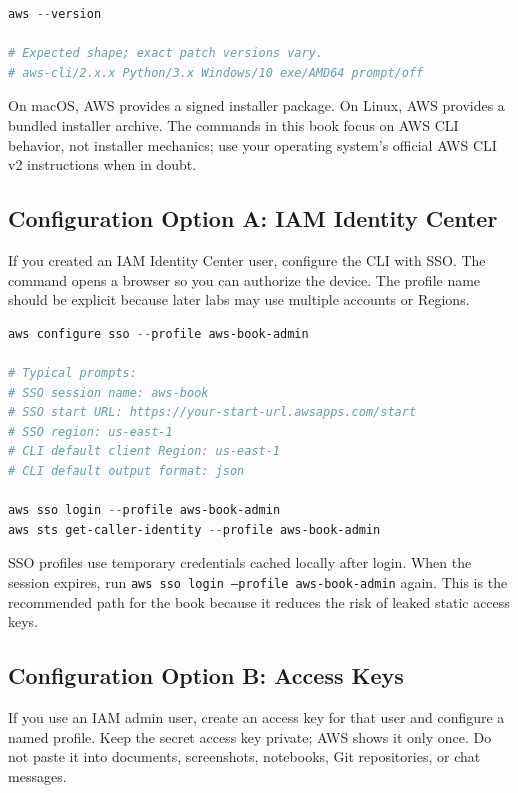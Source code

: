 \begin{lstlisting}[language=PowerShell,caption={Verifying AWS CLI v2 from Windows PowerShell.},label={lst:aws-cli-version}]
aws --version

# Expected shape; exact patch versions vary.
# aws-cli/2.x.x Python/3.x Windows/10 exe/AMD64 prompt/off
\end{lstlisting}

On macOS, AWS provides a signed installer package. On Linux, AWS provides a bundled installer archive. The commands in this book focus on AWS CLI behavior, not installer mechanics; use your operating system's official AWS CLI v2 instructions when in doubt.

\subsection{Configuration Option A: IAM Identity Center}
If you created an IAM Identity Center user, configure the CLI with SSO. The command opens a browser so you can authorize the device. The profile name should be explicit because later labs may use multiple accounts or Regions.

\begin{lstlisting}[language=PowerShell,caption={Configuring an AWS CLI profile with IAM Identity Center.},label={lst:aws-configure-sso}]
aws configure sso --profile aws-book-admin

# Typical prompts:
# SSO session name: aws-book
# SSO start URL: https://your-start-url.awsapps.com/start
# SSO region: us-east-1
# CLI default client Region: us-east-1
# CLI default output format: json

aws sso login --profile aws-book-admin
aws sts get-caller-identity --profile aws-book-admin
\end{lstlisting}

SSO profiles use temporary credentials cached locally after login. When the session expires, run \texttt{aws sso login --profile aws-book-admin} again. This is the recommended path for the book because it reduces the risk of leaked static access keys.

\subsection{Configuration Option B: Access Keys}
If you use an IAM admin user, create an access key for that user and configure a named profile. Keep the secret access key private; AWS shows it only once. Do not paste it into documents, screenshots, notebooks, Git repositories, or chat messages.

